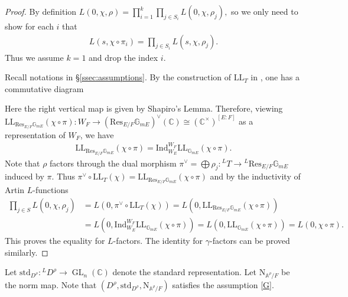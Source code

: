 \documentclass[10pt]{amsart}
\theoremstyle{definition}
\numberwithin{equation}{section}
\DeclareMathOperator{\GL}{\mathrm{GL}}
\numberwithin{equation}{subsection}
\newcommand{\Ind}{\mathrm{Ind}}
\newcommand{\CC}{\mathbb{C}}
\newcommand{\GG}{\mathbb{G}}
\newcommand{\Temp}{\mathrm{Temp}}
\begin{document}
\begin{proof} 
By definition $L(0,\chi,\rho) = \prod_{i=1}^k\prod_{j\in S_i} L(0,\chi,\rho_j),$
so we only need to show for each $i$ that
\begin{align*}
    L(s,\chi\circ \pi_i) = \prod_{j\in S_i} L(s,\chi,\rho_j).
\end{align*}
Thus we assume $k=1$ and drop the index $i$.

Recall notations in \S \ref{ssec:assumptions}. By the construction of $\mathrm{LL}_T$ in \cite{Langlands:tori}, one has a commutative diagram
\begin{center}
\end{center}
Here the right vertical map is given by Shapiro's Lemma. Therefore, viewing $\mathrm{LL}_{\mathrm{Res}_{E/F}\mathbb{G}_{mE}}(\chi\circ \pi): W_F\to (\mathrm{Res}_{E/F}\mathbb{G}_{mE})^\vee(\CC)\cong (\CC^\times)^{[E:F]}$ as a representation of $W_F$, we have
\begin{align*}
    \mathrm{LL}_{\mathrm{Res}_{E/F}\mathbb{G}_{mE}}(\chi\circ\pi) = \Ind_{W_{E}}^{W_F}\mathrm{LL}_{\mathbb{G}_{mE}}(\chi\circ\pi).
\end{align*}
Note that $\rho$ factors through the dual morphism $\pi^\lor=\bigoplus \rho_j:{}^LT\longrightarrow {}^L\mathrm{Res}_{E/F}\GG_{mE}$ induced by $\pi.$ Thus $\pi^\vee\circ\mathrm{LL}_{T}(\chi) = \mathrm{LL}_{\mathrm{Res}_{E/F}\mathbb{G}_{mE}}(\chi\circ\pi)$ and by the inductivity of Artin $L$-functions
\begin{align*}
     \prod_{j\in S} L(0,\chi,\rho_j)&=L(0,\pi^\vee\circ\mathrm{LL}_{T}(\chi))=L(0, \mathrm{LL}_{\mathrm{Res}_{E/F}\mathbb{G}_{mE}}(\chi\circ\pi))\\
     &=L(0,\Ind_{W_{E}}^{W_F}\mathrm{LL}_{\mathbb{G}_{mE}}(\chi\circ\pi)) = L(0,\mathrm{LL}_{\mathbb{G}_{mE}}(\chi\circ\pi)) = L(0,\chi\circ\pi).
\end{align*}
This proves the equality for $L$-factors. The identity for $\gamma$-factors can be proved similarly.
\end{proof}

Let $\mathrm{std}_{D^\rho}:{}^LD^\rho\to \GL_{n}(\CC)$ denote the standard representation. Let $\mathrm{N}_{\mathbb{A}^\rho/F}$ be the norm map. Note that $(D^\rho,\mathrm{std}_{D^\rho},\mathrm{N}_{\mathbb{A}^\rho/F})$ satisfies the assumption \eqref{G}.
 
\end{document}

